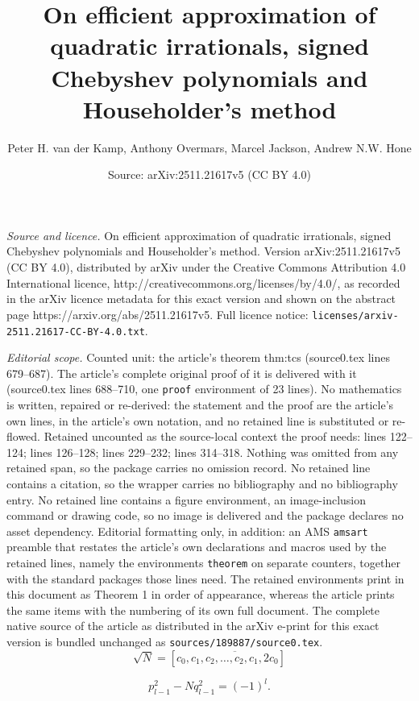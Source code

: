 \documentclass[10pt,a4paper]{amsart}
\title{On efficient approximation of quadratic irrationals, signed Chebyshev polynomials and Householder's method}
\author{Peter H. van der Kamp, Anthony Overmars, Marcel Jackson, Andrew N.W. Hone}
\date{Source: arXiv:2511.21617v5 (CC BY 4.0)}
\begin{document}
\maketitle

\noindent\emph{Source and licence.} On efficient approximation of quadratic irrationals, signed Chebyshev polynomials and Householder's method. Version arXiv:2511.21617v5 (CC BY 4.0), distributed by arXiv under the Creative Commons Attribution 4.0 International licence, http://creativecommons.org/licenses/by/4.0/, as recorded in the arXiv licence metadata for this exact version and shown on the abstract page https://arxiv.org/abs/2511.21617v5. Full licence notice: \texttt{licenses/arxiv-2511.21617-CC-BY-4.0.txt}.\par\smallskip

\noindent\textit{Editorial scope.} Counted unit: the article's theorem thm:tcs (source0.tex lines 679--687). The article's complete original proof of it is delivered with it (source0.tex lines 688--710, one \texttt{proof} environment of 23 lines). No mathematics is written, repaired or re-derived: the statement and the proof are the article's own lines, in the article's own notation, and no retained line is substituted or re-flowed.  Retained uncounted as the source-local context the proof needs: lines 122--124; lines 126--128; lines 229--232; lines 314--318.  Nothing was omitted from any retained span, so the package carries no omission record.  No retained line contains a citation, so the wrapper carries no bibliography and no bibliography entry.  No retained line contains a figure environment, an image-inclusion command or drawing code, so no image is delivered and the package declares no asset dependency.  Editorial formatting only, in addition: an AMS \texttt{amsart} preamble that restates the article's own declarations and macros used by the retained lines, namely the environments \texttt{theorem} on separate counters, together with the standard packages those lines need.  The retained environments print in this document as Theorem 1 in order of appearance, whereas the article prints the same items with the numbering of its own full document.  The complete native source of the article as distributed in the arXiv e-print for this exact version is bundled unchanged as \texttt{sources/189887/source0.tex}.
\begin{equation} \label{eq:sn}
\sqrt{N}=[c_0,\overline{c_1,c_2,\ldots,c_{2},c_{1},2c_0}]
\end{equation}

\begin{equation} \label{eq:Pll}
p_{l-1}^2-Nq_{l-1}^2=(-1)^l.
\end{equation}
\end{document}
